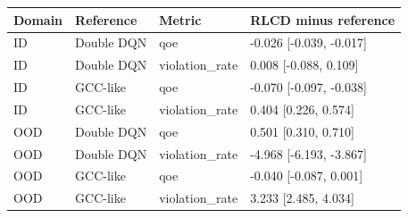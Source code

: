\begin{tabular}{llll}
\toprule
Domain & Reference & Metric & RLCD minus reference \\
\midrule
ID & Double DQN & qoe & -0.026 [-0.039, -0.017] \\
ID & Double DQN & violation\_rate & 0.008 [-0.088, 0.109] \\
ID & GCC-like & qoe & -0.070 [-0.097, -0.038] \\
ID & GCC-like & violation\_rate & 0.404 [0.226, 0.574] \\
OOD & Double DQN & qoe & 0.501 [0.310, 0.710] \\
OOD & Double DQN & violation\_rate & -4.968 [-6.193, -3.867] \\
OOD & GCC-like & qoe & -0.040 [-0.087, 0.001] \\
OOD & GCC-like & violation\_rate & 3.233 [2.485, 4.034] \\
\bottomrule
\end{tabular}
